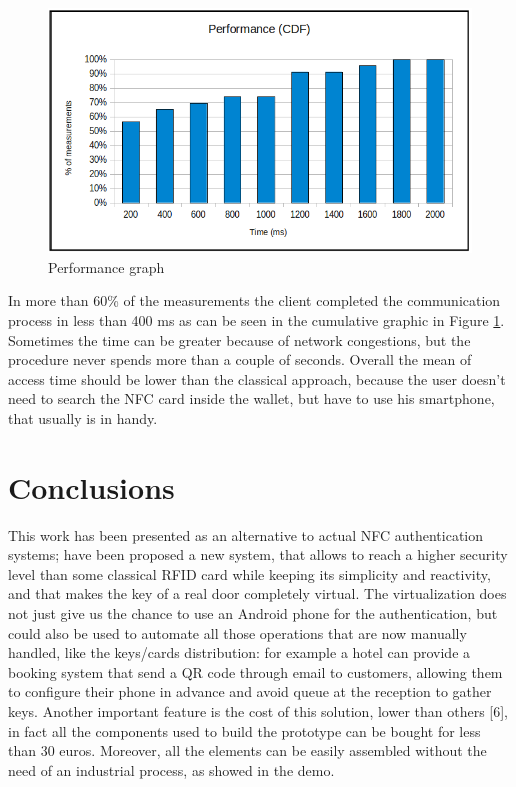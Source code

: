 \documentclass[conference]{IEEEtran}
\begin{document}
\begin{figure}[h]
\centering
\includegraphics[scale=0.35]{fig7}
\caption{Performance graph}
\label{graph}
\end{figure}

In more than 60\% of the measurements the client completed the communication process in less than 400 ms as can be seen in the cumulative graphic in Figure \ref{graph}.  Sometimes the time can be greater because of network congestions, but the procedure never spends more than a couple of seconds. 
Overall the mean of access time should be lower than the classical approach, because the user doesn’t need to search the NFC card inside the wallet, but have to use his smartphone, that usually is in handy.

\section{Conclusions}

This work has been presented as an alternative to actual NFC authentication systems; have been proposed a new system, that allows to reach a higher security level than some classical RFID card while keeping its simplicity and reactivity, and that makes the key of a real door completely virtual. The virtualization does not just give us the chance to use an Android phone for the authentication, but could also be used to automate all those operations that are now manually handled, like the keys/cards distribution: for example a hotel can provide a booking system that send a QR code through email to customers, allowing them to configure their phone in advance and avoid queue at the reception to gather keys.
Another important feature is the cost of this solution, lower than others [6], in fact all the components used to build the prototype can be bought for less than 30 euros. Moreover, all the elements can be easily assembled without the need of an industrial process, as showed in the demo.
\end{document}

